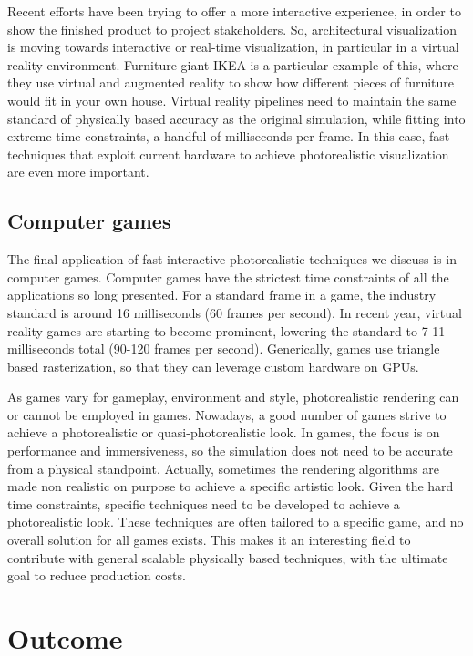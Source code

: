 Recent efforts have been trying to offer a more interactive experience, in order to show the finished product to project stakeholders. So, architectural visualization is moving towards interactive or real-time visualization, in particular in a virtual reality environment. Furniture giant IKEA is a particular example of this, where they use virtual and augmented reality to show how different pieces of furniture would fit in your own house. Virtual reality pipelines need to maintain the same standard of physically based accuracy as the original simulation, while fitting into extreme time constraints, a handful of milliseconds per frame. In this case, fast techniques that exploit current hardware to achieve photorealistic visualization are even more important.
\vspace{-1em}
\subsection{Computer games}
The final application of fast interactive photorealistic techniques we discuss is in computer games. Computer games have the strictest time constraints of all the applications so long presented. For a standard frame in a game, the industry standard is around 16 milliseconds (60 frames per second). In recent year, virtual reality games are starting to become prominent, lowering the standard to 7-11 milliseconds total (90-120 frames per second). Generically, games use triangle based rasterization, so that they can leverage custom hardware on GPUs. 

As games vary for gameplay, environment and style, photorealistic rendering can or cannot be employed in games. Nowadays, a good number of games strive to achieve a photorealistic or quasi-photorealistic look. In games, the focus is on performance and immersiveness, so the simulation does not need to be accurate from a physical standpoint. Actually, sometimes the rendering algorithms are made non realistic on purpose to achieve a specific artistic look. Given the hard time constraints, specific techniques need to be developed to achieve a photorealistic look. These techniques are often tailored to a specific game, and no overall solution for all games exists. This makes it an interesting field to contribute with general scalable physically based techniques, with the ultimate goal to reduce production costs.

\section{Outcome}

